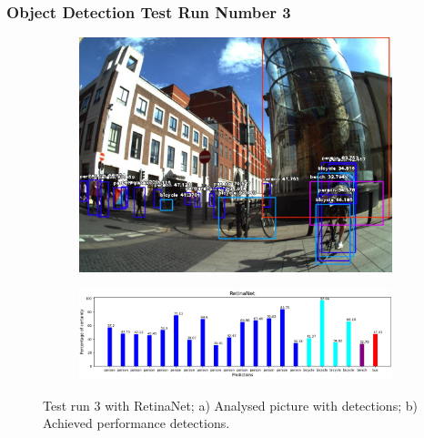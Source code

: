       \subsubsection{Object Detection Test Run Number 3}



      \begin{figure}[H]
        \centering
        \captionsetup{justification=centering}

        \begin{subfigure}{0.29\textwidth}
        \includegraphics[width=\textwidth]{Sections/4InitialWork/4_images_obj_run4/retinaNet.jpg} 
        \caption{}
        \end{subfigure}
        \begin{subfigure}{0.7\textwidth}
        \includegraphics[width=\textwidth]{Sections/4InitialWork/4_images_obj_run4/retinaNet_graph.png}
        \caption{}
        \end{subfigure}
        
        \caption{ 
        Test run 3 with RetinaNet; a) Analysed picture with detections; b) Achieved performance detections. }
        \end{figure}



